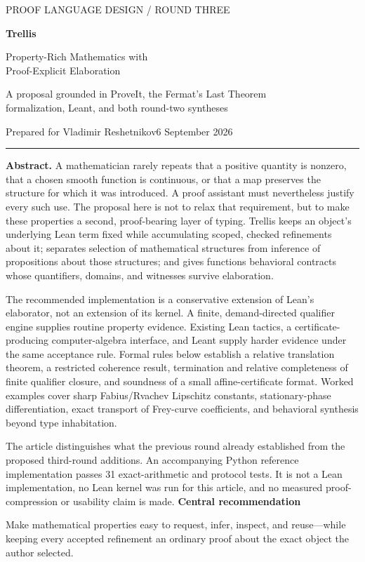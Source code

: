 \documentclass[11pt,a4paper]{article}
\theoremstyle{definition}
\theoremstyle{remark}
\begin{document}
\begin{titlepage}
\vspace*{13mm}
{\large\sffamily\color{ink} PROOF LANGUAGE DESIGN \quad / \quad ROUND THREE\par}
\vspace{12mm}
{\Huge\bfseries Trellis\par}
\vspace{5mm}
{\LARGE Property-Rich Mathematics with\\[3pt] Proof-Explicit Elaboration\par}
\vspace{11mm}
{\large A proposal grounded in ProveIt, the Fermat's Last Theorem\\formalization, Leant, and both round-two syntheses\par}
\vspace{8mm}
{\normalsize Prepared for Vladimir Reshetnikov\hfill 6 September 2026\par}
\vspace{11mm}
\hrule
\vspace{6mm}
\textbf{Abstract.}
A mathematician rarely repeats that a positive quantity is nonzero, that a chosen smooth function is continuous, or that a map preserves the structure for which it was introduced. A proof assistant must nevertheless justify every such use. The proposal here is not to relax that requirement, but to make these properties a second, proof-bearing layer of typing. Trellis keeps an object's underlying Lean term fixed while accumulating scoped, checked refinements about it; separates selection of mathematical structures from inference of propositions about those structures; and gives functions behavioral contracts whose quantifiers, domains, and witnesses survive elaboration.

The recommended implementation is a conservative extension of Lean's elaborator, not an extension of its kernel. A finite, demand-directed qualifier engine supplies routine property evidence. Existing Lean tactics, a certificate-producing computer-algebra interface, and Leant supply harder evidence under the same acceptance rule. Formal rules below establish a relative translation theorem, a restricted coherence result, termination and relative completeness of finite qualifier closure, and soundness of a small affine-certificate format. Worked examples cover sharp Fabius/Rvachev Lipschitz constants, stationary-phase differentiation, exact transport of Frey-curve coefficients, and behavioral synthesis beyond type inhabitation.

The article distinguishes what the previous round already established from the proposed third-round additions. An accompanying Python reference implementation passes 31 exact-arithmetic and protocol tests. It is not a Lean implementation, no Lean kernel was run for this article, and no measured proof-compression or usability claim is made.
\vfill
\textbf{Central recommendation}\par
Make mathematical properties easy to request, infer, inspect, and reuse---while keeping every accepted refinement an ordinary proof about the exact object the author selected.
\end{titlepage}
\end{document}
